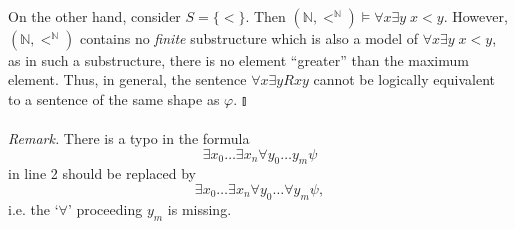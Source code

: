 \begin{enumerate}[1.]
\\
On the other hand, consider $S = \{ < \}$. Then $(\mathbb{N}, <^\mathbb{N}) \models \forall x \exists y \; x < y$. However, $(\mathbb{N}, <^\mathbb{N})$ contains no \emph{finite} substructure which is also a model of $\forall x \exists y \; x < y$, as in such a substructure, there is no element ``greater'' than the maximum element. Thus, in general, the sentence $\forall x \exists y Rxy$ cannot be logically equivalent to a sentence of the same shape as $\varphi$. \nolinebreak\hfill$\talloblong$\\
\ \\
\textit{Remark.} There is a typo in the formula
\[
\exists x_0 \ldots \exists x_n \forall y_0 \ldots y_m \psi
\]
in line 2 should be replaced by
\[
\exists x_0 \ldots \exists x_n \forall y_0 \ldots \forall y_m \psi,
\]
i.e. the `$\forall$' proceeding $y_m$ is missing.
\end{enumerate}
